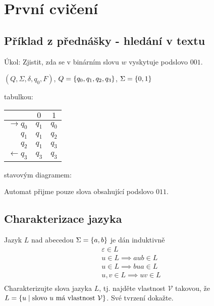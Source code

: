 \section{První cvičení}

\subsection{Příklad z přednášky - hledání v textu}
Úkol: Zjistit, zda se v binárním slovu $w$ vyskytuje podslovo $001$. 

$(Q, \Sigma, \delta, q_0, F)$, $Q = \left\lbrace q_0, q_1, q_2, q_3 \right\rbrace$, $\Sigma = \left\lbrace 0,1 \right\rbrace$ 

\begin{multicols}{2}

    tabulkou: 

    \begin{tabular}{|r|c|c|}
        \hline
        & $0$ & $1$\\
        \hline
        \hline
        $\to q_0$  & $q_1$ & $q_0$\\
        $q_1$      & $q_1$ & $q_2$\\
        $q_2$      & $q_1$ & $q_3$\\
        $\gets q_3$& $q_3$ & $q_3$\\
        \hline
    \end{tabular}
    
    stavovým diagramem:

    
\end{multicols}

Automat přijme pouze slova obsahující podslovo $011$. 

\subsection{Charakterizace jazyka}
Jazyk $L$ nad abecedou $\Sigma = \left\lbrace a,b \right\rbrace$ je dán induktivně
\begin{gather*}
    \varepsilon \in L \\
    u \in L \implies aub \in L\\
    u \in L \implies bua \in L\\
    u, v \in L \implies uv \in L\\
\end{gather*}
Charakterizujte slova jazyka $L$, tj. najděte vlastnost $\mathcal{V}$ takovou, že $L = \left\lbrace u \mid \text{slovo } u
\text{ má vlastnost } \mathcal{V}  \right\rbrace$. Své tvrzení dokažte.

